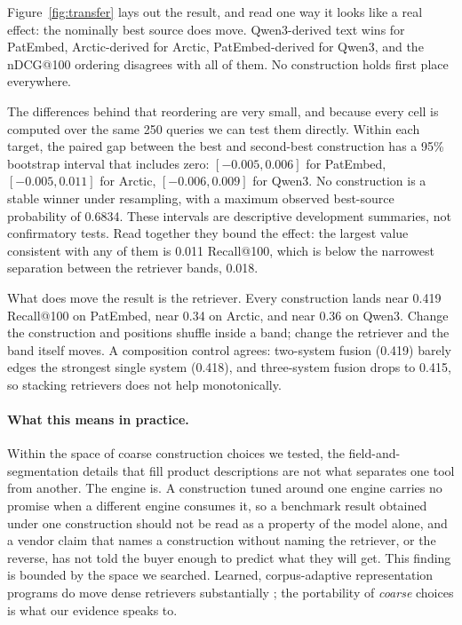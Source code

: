 \documentclass[preprint,11pt,authoryear]{elsarticle}
\begin{document}
Figure~\ref{fig:transfer} lays out the result, and read one way it looks like a real effect: the nominally best source does move. Qwen3-derived text wins for PatEmbed, Arctic-derived for Arctic, PatEmbed-derived for Qwen3, and the nDCG@100 ordering disagrees with all of them. No construction holds first place everywhere.

The differences behind that reordering are very small, and because every cell is computed over the same 250 queries we can test them directly. Within each target, the paired gap between the best and second-best construction has a 95\% bootstrap interval that includes zero: $[-0.005, 0.006]$ for PatEmbed, $[-0.005, 0.011]$ for Arctic, $[-0.006, 0.009]$ for Qwen3. No construction is a stable winner under resampling, with a maximum observed best-source probability of 0.6834. These intervals are descriptive development summaries, not confirmatory tests. Read together they bound the effect: the largest value consistent with any of them is 0.011 Recall@100, which is below the narrowest separation between the retriever bands, 0.018.

What does move the result is the retriever. Every construction lands near 0.419 Recall@100 on PatEmbed, near 0.34 on Arctic, and near 0.36 on Qwen3. Change the construction and positions shuffle inside a band; change the retriever and the band itself moves. A composition control agrees: two-system fusion (0.419) barely edges the strongest single system (0.418), and three-system fusion drops to 0.415, so stacking retrievers does not help monotonically.

\paragraph{What this means in practice.} Within the space of coarse construction choices we tested, the field-and-segmentation details that fill product descriptions are not what separates one tool from another. The engine is. A construction tuned around one engine carries no promise when a different engine consumes it, so a benchmark result obtained under one construction should not be read as a property of the model alone, and a vendor claim that names a construction without naming the retriever, or the reverse, has not told the buyer enough to predict what they will get. This finding is bounded by the space we searched. Learned, corpus-adaptive representation programs do move dense retrievers substantially \citep{onuallain2026autoindex}; the portability of \emph{coarse} choices is what our evidence speaks to.
\end{document}
